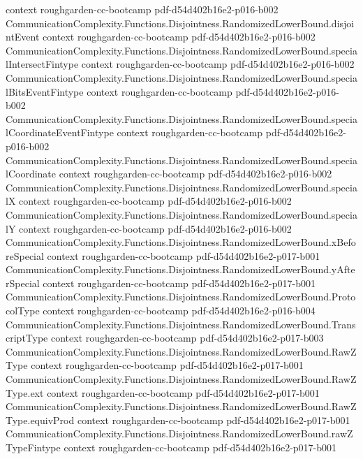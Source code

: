 \begin{theorem}
  {context}
  {roughgarden-cc-bootcamp}
  {pdf-d54d402b16e2-p016-b002}
\proofstep
  {CommunicationComplexity.Functions.Disjointness.RandomizedLowerBound.disjointEvent}
  {context}
  {roughgarden-cc-bootcamp}
  {pdf-d54d402b16e2-p016-b002}
\proofstep
  {CommunicationComplexity.Functions.Disjointness.RandomizedLowerBound.specialIntersectFintype}
  {context}
  {roughgarden-cc-bootcamp}
  {pdf-d54d402b16e2-p016-b002}
\proofstep
  {CommunicationComplexity.Functions.Disjointness.RandomizedLowerBound.specialBitsEventFintype}
  {context}
  {roughgarden-cc-bootcamp}
  {pdf-d54d402b16e2-p016-b002}
\proofstep
  {CommunicationComplexity.Functions.Disjointness.RandomizedLowerBound.specialCoordinateEventFintype}
  {context}
  {roughgarden-cc-bootcamp}
  {pdf-d54d402b16e2-p016-b002}
\proofstep
  {CommunicationComplexity.Functions.Disjointness.RandomizedLowerBound.specialCoordinate}
  {context}
  {roughgarden-cc-bootcamp}
  {pdf-d54d402b16e2-p016-b002}
\proofstep
  {CommunicationComplexity.Functions.Disjointness.RandomizedLowerBound.specialX}
  {context}
  {roughgarden-cc-bootcamp}
  {pdf-d54d402b16e2-p016-b002}
\proofstep
  {CommunicationComplexity.Functions.Disjointness.RandomizedLowerBound.specialY}
  {context}
  {roughgarden-cc-bootcamp}
  {pdf-d54d402b16e2-p016-b002}
\proofstep
  {CommunicationComplexity.Functions.Disjointness.RandomizedLowerBound.xBeforeSpecial}
  {context}
  {roughgarden-cc-bootcamp}
  {pdf-d54d402b16e2-p017-b001}
\proofstep
  {CommunicationComplexity.Functions.Disjointness.RandomizedLowerBound.yAfterSpecial}
  {context}
  {roughgarden-cc-bootcamp}
  {pdf-d54d402b16e2-p017-b001}
\proofstep
  {CommunicationComplexity.Functions.Disjointness.RandomizedLowerBound.ProtocolType}
  {context}
  {roughgarden-cc-bootcamp}
  {pdf-d54d402b16e2-p016-b004}
\proofstep
  {CommunicationComplexity.Functions.Disjointness.RandomizedLowerBound.TranscriptType}
  {context}
  {roughgarden-cc-bootcamp}
  {pdf-d54d402b16e2-p017-b003}
\proofstep
  {CommunicationComplexity.Functions.Disjointness.RandomizedLowerBound.RawZType}
  {context}
  {roughgarden-cc-bootcamp}
  {pdf-d54d402b16e2-p017-b001}
\proofstep
  {CommunicationComplexity.Functions.Disjointness.RandomizedLowerBound.RawZType.ext}
  {context}
  {roughgarden-cc-bootcamp}
  {pdf-d54d402b16e2-p017-b001}
\proofstep
  {CommunicationComplexity.Functions.Disjointness.RandomizedLowerBound.RawZType.equivProd}
  {context}
  {roughgarden-cc-bootcamp}
  {pdf-d54d402b16e2-p017-b001}
\proofstep
  {CommunicationComplexity.Functions.Disjointness.RandomizedLowerBound.rawZTypeFintype}
  {context}
  {roughgarden-cc-bootcamp}
  {pdf-d54d402b16e2-p017-b001}

\end{theorem}
